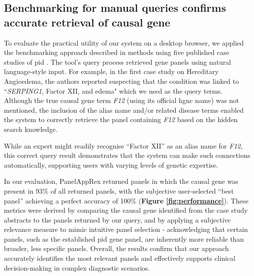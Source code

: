 \subsection{Benchmarking for manual queries confirms accurate retrieval of causal gene}
\noindent
To evaluate the practical utility of our system on a desktop browser, we applied the benchmarking approach described in methods using five published case studies of \ac{pid}
\cite{arruda_genetic_2015, 
mcaleer_severe_2015,
verhoeven_hematopoietic_2022,
magerus-chatinet_autoimmune_2013,
sharfe_fatal_2014}. %
The tool's query process retrieved gene panels using natural language-style input. 
For example, in the first case study on Hereditary Angioedema, the authors reported suspecting that the condition was linked to ``\textit{SERPING1}, Factor XII, and edema" which we used as the query terms. 
Although the true causal gene term \textit{F12} (using its official \ac{hgnc} name) was not mentioned, the inclusion of the alias name and/or related disease terms enabled the system to correctly retrieve the panel containing \textit{F12} based on the hidden search knowledge.

While an expert might readily recognise ``Factor XII'' as an alias name for \textit{F12}, this correct query result demonstrates that the system can make such connections automatically, supporting users with varying levels of genetic expertise.

In our evaluation, PanelAppRex returned panels in which the causal gene was present in 93\% of all returned panels, with the subjective user-selected ``best panel'' achieving a perfect accuracy of 100\% 
(\textbf{Figure \ref{fig:performance}}).
 These metrics were derived by comparing the causal gene identified from the case study abstracts to the panels returned by our query, and by applying a subjective relevance measure to mimic intuitive panel selection - acknowledging that certain panels, such as the established \ac{pid} gene panel, are inherently more reliable than broader, less specific panels.
Overall, the results confirm that our approach accurately identifies the most relevant panels and effectively supports clinical decision-making in complex diagnostic scenarios.

